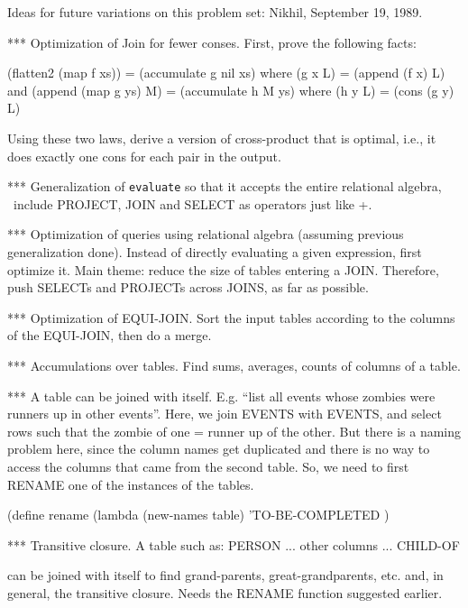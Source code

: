 
Ideas for future variations on this problem set:
Nikhil, September 19, 1989.

*** Optimization of Join for fewer conses.  First, prove the following facts:

    (flatten2 (map f xs)) = (accumulate g nil xs)
    where (g x L) = (append (f x) L)
and
    (append (map g ys) M) = (accumulate h M ys)
    where (h y L) = (cons (g y) L)

Using these two laws, derive a version of cross-product that is optimal,
i.e., it does exactly one cons for each pair in the output.

*** Generalization of {\tt evaluate} so that it accepts the entire relational
algebra, \ie\ include PROJECT, JOIN and SELECT as operators just like +.

*** Optimization of queries using relational algebra (assuming previous
generalization done).  Instead of directly evaluating a given expression,
first optimize it.  Main theme: reduce the size of tables entering a JOIN.
Therefore, push SELECTs and PROJECTs across JOINS, as far as possible.

*** Optimization of EQUI-JOIN.  Sort the input tables according to the
columns of the EQUI-JOIN, then do a merge.

*** Accumulations over tables.  Find sums, averages, counts of columns of
a table.

*** A table can be joined with itself.  E.g. ``list all events whose zombies
were runners up in other events''. Here, we join EVENTS with EVENTS, and
select rows such that the zombie of one = runner up of the other.  But there
is a naming problem here, since the column names get duplicated and there is
no way to access the columns that came from the second table.  So, we need
to first RENAME one of the instances of the tables.

    (define rename (lambda (new-names table) 'TO-BE-COMPLETED    )

*** Transitive closure.  A table such as:
        PERSON ... other columns ... CHILD-OF

can be joined with itself to find grand-parents, great-grandparents, etc.
and, in general, the transitive closure. Needs the RENAME function suggested
earlier.

